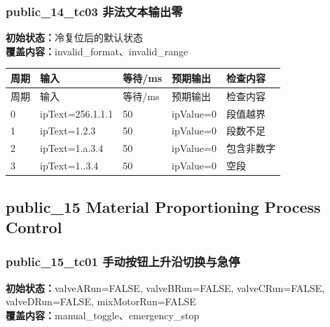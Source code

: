 \subsubsection{{\ttfamily public\_14\_tc03} 非法文本输出零}

\noindent\textbf{初始状态：}冷复位后的默认状态\\

\textbf{覆盖内容：}invalid\_format、invalid\_range

\begin{longtable}{L{1.0cm}L{4.7cm}L{1.4cm}L{4.0cm}L{2.1cm}}

\toprule

周期 & 输入 & 等待/ms & 预期输出 & 检查内容\\

\midrule

\endfirsthead

\toprule

周期 & 输入 & 等待/ms & 预期输出 & 检查内容\\

\midrule

\endhead

0 & ipText=256.1.1.1 & 50 & ipValue=0 & 段值越界\\

1 & ipText=1.2.3 & 50 & ipValue=0 & 段数不足\\

2 & ipText=1.a.3.4 & 50 & ipValue=0 & 包含非数字\\

3 & ipText=1..3.4 & 50 & ipValue=0 & 空段\\

\bottomrule

\end{longtable}

\subsection{{\ttfamily public\_15} Material Proportioning Process Control}

\subsubsection{{\ttfamily public\_15\_tc01} 手动按钮上升沿切换与急停}

\noindent\textbf{初始状态：}valveARun=FALSE, valveBRun=FALSE, valveCRun=FALSE, valveDRun=FALSE, mixMotorRun=FALSE\\

\textbf{覆盖内容：}manual\_toggle、emergency\_stop

